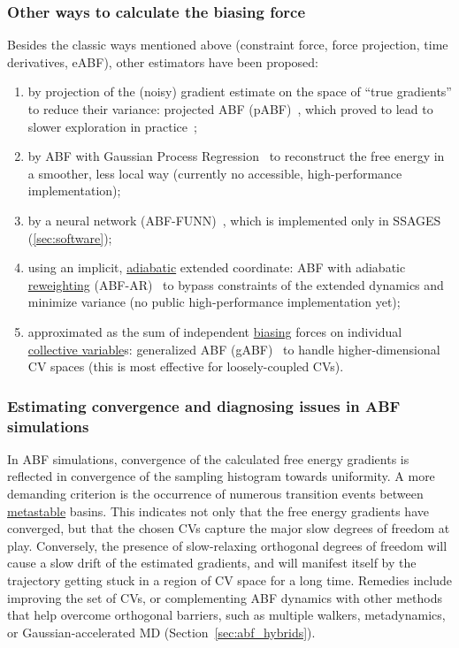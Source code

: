 \documentclass[9pt,review]{livecoms}
\begin{document}
\subsubsection{Other ways to calculate the biasing force}
\label{sec:ABF_variants}

Besides the classic ways mentioned above (constraint force, force projection, time derivatives, eABF), other estimators have been proposed:
\begin{enumerate}
\item by projection of the (noisy) gradient estimate on the space of ``true gradients'' to reduce their variance: projected ABF (pABF)~\cite{lelievre-rousset-stoltz-07-a,Alrachid2015}, which proved to lead to slower exploration in practice~\cite{Henin2021integration};
\item by ABF with Gaussian Process Regression~\cite{Mones2016} to reconstruct the free energy in a smoother, less local way (currently no accessible, high-performance implementation);
\item by a neural network (ABF-FUNN)~\cite{Guo2018}, which is implemented only in SSAGES (\ref{sec:software});
\item using an implicit, \hyperlink{ref:AdiabaticDyn} {adiabatic} extended coordinate: ABF with adiabatic \hyperlink{ref:Reweighting} {reweighting} (ABF-AR)~\cite{Cao2014} to bypass constraints of the extended dynamics and minimize variance (no public high-performance implementation yet);
\item approximated as the sum of independent \hyperlink{ref:biasingE} {biasing} forces on individual \hyperlink{ref:CV} {collective variable}s: generalized ABF (gABF)~\cite{Chipot2011, Zhao2017} to handle higher-dimensional CV spaces (this is most effective for loosely-coupled CVs).
\end{enumerate}


\subsubsection{Estimating convergence and diagnosing issues in ABF simulations}

In ABF simulations, convergence of the calculated free energy gradients is reflected in convergence of the sampling histogram towards uniformity.
A more demanding criterion is the occurrence of numerous transition events between \hyperlink{ref:metastab} {metastable} basins.
This indicates not only that the free energy gradients have converged, but that the chosen CVs capture the major slow degrees of freedom at play.
Conversely, the presence of slow-relaxing orthogonal degrees of freedom will cause a slow drift of the estimated gradients, and will manifest itself by the trajectory getting stuck in a region of CV space for a long time.
Remedies include improving the set of CVs, or complementing ABF dynamics with other methods that help overcome orthogonal barriers, such as multiple walkers, metadynamics, or Gaussian-accelerated MD (Section~\ref{sec:abf_hybrids}).
\end{document}
